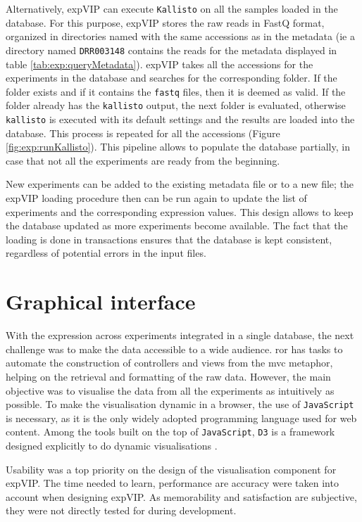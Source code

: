 Alternatively, expVIP can execute \verb|Kallisto| on all the samples loaded in the database. 
For this purpose, expVIP stores the raw reads in FastQ format, organized in directories named with the same accessions as in the metadata (ie a directory named \verb|DRR003148| contains the reads for the metadata displayed in table \ref{tab:exp:queryMetadata}). 
expVIP takes all the accessions for the experiments in the database and searches for the corresponding folder. 
If the folder exists and if it contains the \verb|fastq| files, then it is deemed as valid. 
If the folder already has the \verb|kallisto| output, the next folder is evaluated, otherwise \verb|kallisto| is executed with its default settings and the results are loaded into the database. 
This process is repeated for all the accessions (Figure \ref{fig:exp:runKallisto}).  
This pipeline allows to populate the database partially, in case that not all the experiments are ready from the beginning. 

New experiments can be added to the existing metadata file  or to a new file; the expVIP loading procedure then can be run again to update the list of experiments and the corresponding expression values. 
This design allows to keep the database updated as more experiments become available. 
The fact that the loading is done in transactions ensures that the database is kept consistent, regardless of potential errors in the input files. 

\section{Graphical interface}
\label{exp:gui}  
With the expression across experiments integrated in a single database, the next challenge was to make the data accessible to a wide audience. 
\acrshort{ror} has tasks to automate the construction of controllers and views from the \acrshort{mvc} metaphor, helping on the retrieval and formatting of the raw data. 
However, the main objective was to visualise the data from all the experiments as intuitively as possible. 
To make the visualisation dynamic in a browser, the use of \verb|JavaScript| is necessary, as it is the only widely adopted programming language used for web content. 
Among the tools built on the top of \verb|JavaScript|, \verb|D3| is a framework designed explicitly to do dynamic visualisations \citep{Bostock2011}. 

Usability was a top priority on the design of the visualisation component for expVIP. 
The time needed to learn, performance are accuracy were taken into account when designing expVIP. 
As memorability and satisfaction are subjective, they were not directly tested for during development.  


